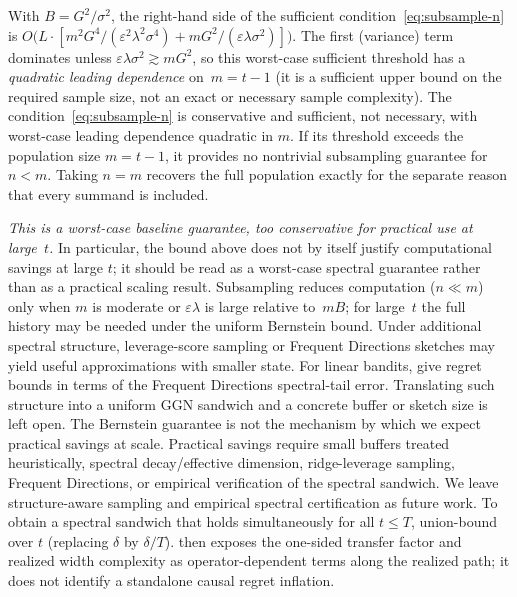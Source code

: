 With $B=G^2/\sigma^2$, the right-hand side of the sufficient
condition~\eqref{eq:subsample-n} is
$O\!\bigl(L\cdot[m^2G^4/(\varepsilon^2\lambda^2\sigma^4)
  + mG^2/(\varepsilon\lambda\sigma^2)]\bigr)$.
The first (variance) term dominates unless
$\varepsilon\lambda\sigma^2\gtrsim mG^2$, so this worst-case sufficient threshold has
a \emph{quadratic leading dependence} on~$m=t{-}1$ (it is a sufficient upper bound on
the required sample size, not an exact or necessary sample complexity).
The condition~\eqref{eq:subsample-n} is conservative and sufficient, not
necessary, with worst-case leading dependence quadratic in $m$.  If its
threshold exceeds the population size $m=t{-}1$, it provides no nontrivial
subsampling guarantee for $n<m$.  Taking $n=m$ recovers the full population
exactly for the separate reason that every summand is included.

\emph{This is a worst-case baseline guarantee, too conservative for
practical use at large~$t$.}
In particular, the bound above does not by itself justify computational
savings at large $t$; it should be read as a worst-case spectral
guarantee rather than as a practical scaling result.
Subsampling reduces computation ($n\ll m$) only when $m$ is moderate or
$\varepsilon\lambda$ is large relative to~$mB$; for large~$t$ the full
history may be needed under the uniform Bernstein bound.
Under additional spectral structure, leverage-score sampling or Frequent
Directions sketches may yield useful approximations with smaller state.
For linear bandits, \citet{kuzborskij2019efficient} give regret bounds in terms
of the Frequent Directions spectral-tail error.  Translating such structure
into a uniform GGN sandwich and a concrete buffer or sketch size is left open.
The Bernstein guarantee is not the mechanism by which we expect
practical savings at scale.  Practical savings require small buffers
treated heuristically, spectral decay/effective dimension,
ridge-leverage sampling, Frequent Directions, or empirical verification
of the spectral sandwich.  We leave structure-aware sampling and empirical
spectral certification as future work.
To obtain a spectral sandwich that holds simultaneously for all
$t\le T$, union-bound over $t$ (replacing $\delta$ by $\delta/T$).
 then exposes the one-sided transfer factor and
realized width complexity as operator-dependent terms along the realized path;
it does not identify a standalone causal regret inflation.

